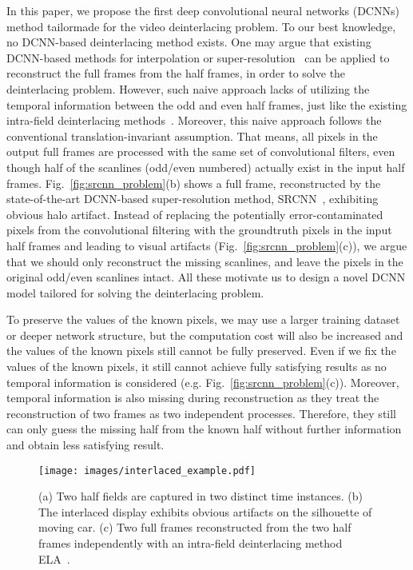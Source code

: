 

In this paper, we propose the first deep convolutional neural networks (DCNNs)
method tailormade for the video deinterlacing problem. To our best knowledge, no
DCNN-based deinterlacing method exists. One may argue that existing DCNN-based
methods for interpolation or super-resolution~\cite{mallat2016understanding,dong2016image} can be applied to
reconstruct the full frames from the half frames, in order to solve the
deinterlacing problem. However, such naive approach lacks of utilizing the
temporal information between the odd and even half frames, just like the existing
intra-field deinterlacing methods~\cite{doyle1990interlaced,wang2012efficient}. Moreover,
this naive approach follows the conventional translation-invariant assumption.
That means, all pixels in the output full frames are processed with the same set
of convolutional filters, even though half of the scanlines (odd/even numbered)
actually exist in the input half frames. Fig.~\ref{fig:srcnn_problem}(b) shows
a full frame, reconstructed by the state-of-the-art DCNN-based super-resolution method,
SRCNN~\cite{dong2016image}, exhibiting obvious halo artifact. 
Instead of replacing the potentially error-contaminated pixels from the convolutional filtering with the groundtruth
pixels in the input half frames and leading to visual artifacts
(Fig.~\ref{fig:srcnn_problem}(c)), we argue that we should only reconstruct the
missing scanlines, and leave the pixels in the original odd/even scanlines
intact. All these motivate us to design a novel DCNN model tailored for
solving the deinterlacing problem.


To
preserve the values of the known pixels, we may use a larger training dataset or
deeper network structure, but the computation cost will also be increased and
the values of the known pixels still cannot be fully preserved. Even if we fix
the values of the known pixels, it still cannot achieve fully satisfying results
as no temporal information is considered (e.g. Fig.~\ref{fig:srcnn_problem}(c)).
Moreover, temporal information is also missing during reconstruction as they
treat the reconstruction of two frames as two independent processes. Therefore,
they still can only guess the missing half from the known half without further
information and obtain less satisfying result. 
\fi 

\begin{figure}[!tp]	
	\texttt{[image: images/interlaced\_example.pdf]}\\
	\caption{(a) Two half fields are captured in two distinct time instances. 
	(b) The interlaced display exhibits obvious artifacts on the silhouette of moving car.
	(c) Two full frames	reconstructed from the two half frames independently with an intra-field deinterlacing method ELA~\cite{doyle1990interlaced}.} \label{fig:interlaced_example}
\end{figure}

